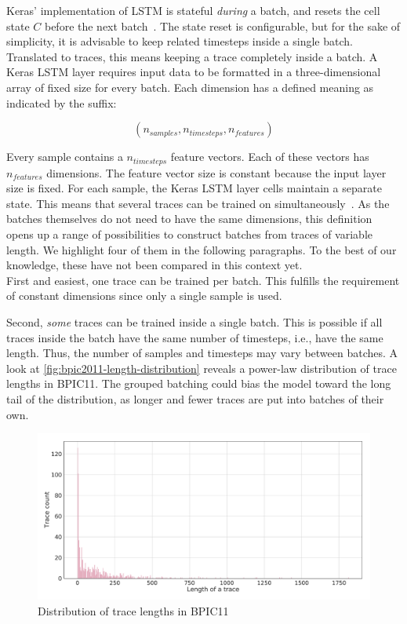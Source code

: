Keras' implementation of LSTM is stateful \textit{during} a batch, and resets the cell state $C$ before the next batch~\cite{web:keras}. The state reset is configurable, but for the sake of simplicity, it is advisable to keep related timesteps inside a single batch. Translated to traces, this means keeping a trace completely inside a batch. A Keras LSTM layer requires input data to be formatted in a three-dimensional array of fixed size for every batch. Each dimension has a defined meaning as indicated by the suffix:

$$(n_{samples}, n_{timesteps}, n_{features})$$

Every sample contains a $n_{timesteps}$ feature vectors.
Each of these vectors has $n_{features}$ dimensions.
The feature vector size is constant because the input layer size is fixed.
For each sample, the Keras LSTM layer cells maintain a separate state.
This means that several traces can be trained on simultaneously~\cite{web:keras-lstm-state}.
As the batches themselves do not need to have the same dimensions, this definition opens up a range of possibilities to construct batches from traces of variable length.
We highlight four of them in the following paragraphs.
To the best of our knowledge, these have not been compared in this context yet.\\

First and easiest, one trace can be trained per batch. This fulfills the requirement of constant dimensions since only a single sample is used.

Second, \textit{some} traces can be trained inside a single batch. This is possible if all traces inside the batch have the same number of timesteps, i.e., have the same length. Thus, the number of samples and timesteps may vary between batches. A look at \autoref{fig:bpic2011-length-distribution} reveals a power-law distribution of trace lengths in BPIC11.
The grouped batching could bias the model toward the long tail of the distribution, as longer and fewer traces are put into batches of their own.

\begin{figure}[ht!]
    \centering
    \includegraphics[width=\textwidth]{gfx/bpic11-length-frequency.pdf}
    \caption{Distribution of trace lengths in BPIC11}
    \label{fig:bpic2011-length-distribution}
\end{figure}

